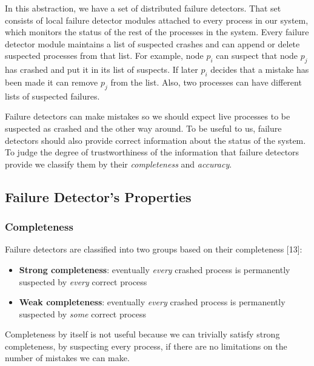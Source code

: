 \documentclass[bsc,frontabs,twoside,singlespacing,parskip,deptreport,hidel]{infthesis}     %
\begin{document}
In this abstraction, we have a set of distributed failure detectors. That set consists of local failure detector modules attached to every process in our system, which monitors the status of the rest of the processes in the system. Every failure detector module maintains a list of suspected crashes and can append or delete suspected processes from that list. For example, node $p_i$ can suspect that node $p_j$ has crashed and put it in its list of suspects. If later $p_i$ decides that a mistake has been made it can remove $p_j$ from the list. Also, two processes can have different lists of suspected failures.

Failure detectors can make mistakes so we should expect live processes to be suspected as crashed and the other way around. To be useful to us, failure detectors should also provide correct information about the status of the system. To judge the degree of trustworthiness of the information that failure detectors provide we classify them by their \textit{completeness} and \textit{accuracy}.

\subsection{Failure Detector's Properties}

\subsubsection*{Completeness}
Failure detectors are classified into two groups based on their completeness [13]:

\begin{itemize}
  \item \textbf{Strong completeness}: eventually \textit{every} crashed process is permanently suspected by \textit{every} correct process
  \item \textbf{Weak completeness}: eventually \textit{every} crashed process is permanently suspected by \textit{some} correct process
\end{itemize}

Completeness by itself is not useful because we can trivially satisfy strong completeness, by suspecting every process, if there are no limitations on the number of mistakes we can make.
\end{document}
